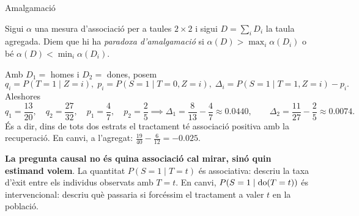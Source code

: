 \documentclass{bestbeamer}
\begin{document}
\begin{frame}{Amalgamació}
\footnotesize\vspace{-2mm}
\begin{definition}\label{def:paradoxa-amalgamacio}
Sigui $\alpha$ una mesura d'associació per a taules $2\times2$ i sigui $D=\sum_iD_i$ la taula agregada. Diem que hi ha \textit{paradoxa d'amalgamació} si $\alpha(D)>\max_i\alpha(D_i)$ o bé $\alpha(D)<\min_i\alpha(D_i)$.
\end{definition}
Amb $D_1=$ homes i $D_2=$ dones, posem
\begin{equation*}
q_i=P(T=1\mid Z=i),\; p_i=P(S=1\mid T=0,Z=i), \; \Delta_i=P(S=1\mid T=1,Z=i)-p_i.
\end{equation*}
Aleshores
\begin{equation*}
q_1=\frac{13}{20},\quad q_2=\frac{27}{32},\quad
p_1=\frac{4}{7},\quad p_2=\frac{2}{5}\implies \Delta_1=\frac{8}{13}-\frac{4}{7}\approx 0.0440,\qquad
\Delta_2=\frac{11}{27}-\frac{2}{5}\approx 0.0074.
\end{equation*}
És a dir, dins de tots dos estrats el tractament té associació positiva amb la recuperació. En canvi, a l'agregat: $\frac{19}{40}-\frac{6}{12}=-0.025$.

\textbf{La pregunta causal no és quina associació cal mirar, sinó quin estimand volem}. La quantitat $P(S=1\mid T=t)$ és associativa: descriu la taxa d'èxit entre els individus observats amb $T=t$. En canvi, $P(S=1\mid\operatorname{do}(T=t))$ és intervencional: descriu què passaria si forcéssim el tractament a valer $t$ en la població.
\end{frame}
\end{document}
